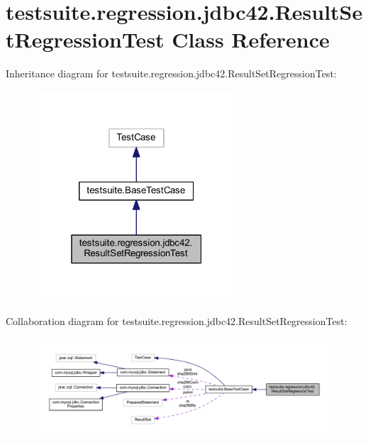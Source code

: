 \hypertarget{classtestsuite_1_1regression_1_1jdbc42_1_1_result_set_regression_test}{}\section{testsuite.\+regression.\+jdbc42.\+Result\+Set\+Regression\+Test Class Reference}
\label{classtestsuite_1_1regression_1_1jdbc42_1_1_result_set_regression_test}


Inheritance diagram for testsuite.\+regression.\+jdbc42.\+Result\+Set\+Regression\+Test\+:
\nopagebreak
\begin{figure}[H]
\begin{center}
\leavevmode
\includegraphics[width=217pt]{classtestsuite_1_1regression_1_1jdbc42_1_1_result_set_regression_test__inherit__graph}
\end{center}
\end{figure}


Collaboration diagram for testsuite.\+regression.\+jdbc42.\+Result\+Set\+Regression\+Test\+:
\nopagebreak
\begin{figure}[H]
\begin{center}
\leavevmode
\includegraphics[width=350pt]{classtestsuite_1_1regression_1_1jdbc42_1_1_result_set_regression_test__coll__graph}
\end{center}
\end{figure}
